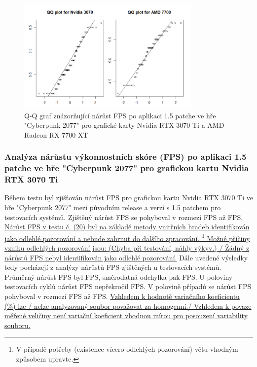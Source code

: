\begin{figure}[h!]
    \centering
    \includegraphics[width=0.8\textwidth]{assets/qq}
    \caption{Q-Q graf znázorňující nárůst FPS po aplikaci 1.5 patche ve hře "Cyberpunk 2077" pro grafické karty Nvidia RTX 3070 Ti a AMD Radeon RX 7700 XT}
    \label{fig:qq}
\end{figure}

\newpage
\subsubsection*{Analýza nárůstu výkonnostních skóre (FPS) po aplikaci 1.5 patche ve hře "Cyberpunk 2077" pro grafickou kartu Nvidia RTX 3070 Ti}

Během testu byl zjišťován nárůst FPS pro grafickou kartu Nvidia RTX 3070 Ti ve hře "Cyberpunk 2077" mezi původním release a verzí s 1.5 patchem 
pro  testovacích systémů. Zjištěný nárůst FPS se pohyboval v rozmezí  FPS
až  FPS. \ul{Nárůst FPS v testu č. \TODO (20) byl na základě metody vnitřních hradeb identifikován jako odlehlé pozorování
a nebude zahrnut do dalšího zpracování. \footnote{V případě potřeby (existence vícero odlehlých pozorování) větu vhodným způsobem upravte.}
Možné příčiny vzniku odlehlých pozorování jsou: \TODO (Chyba při testování, náhly výkyv.) / Žádný z nárůstů
FPS nebyl identifikován jako odlehlé pozorování.} Dále uvedené výsledky tedy pocházejí z analýzy nárůstů
FPS zjištěných u  testovacích systémů. Průměrný nárůst FPS byl  FPS, směrodatná odchylka
pak  FPS. U poloviny testovacích cyklů nárůst FPS nepřekročil  FPS\@.
V polovině případů se nárůst FPS pohyboval v rozmezí  FPS až  FPS. \ul{Vzhledem k hodnotě
variačního koeficientu (\mbox{}\%) lze / nelze analyzovaný soubor považovat za homogenní./ Vzhledem k povaze měřené
veličiny není variační koeficient vhodnou mírou pro posouzení variability souboru.}

